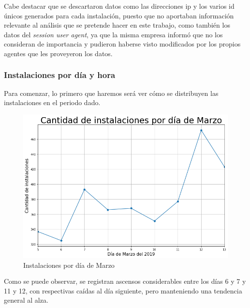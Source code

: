 \documentclass[a4paper, 12pt]{article}
\begin{document}
		Cabe destacar que se descartaron datos como las direcciones ip y los varios id únicos generados para cada instalación,
		puesto que no aportaban información relevante al análisis que se pretende hacer en este trabajo, como también los datos
		del \textit{session user agent}, ya que la misma empresa informó que no los consideran de importancia y pudieron haberse
		visto modificados por los propios agentes que les proveyeron los datos.

	\subsubsection{Instalaciones por día y hora}
		Para comenzar, lo primero que haremos será ver cómo se distribuyen las instalaciones en el periodo dado.
		\FloatBarrier
		\begin{figure}[h]
			\centering
			\includegraphics[width=\textwidth]{images/installs/installspordia.png}
			\caption{Instalaciones por día de Marzo}
		\end{figure}
		\FloatBarrier

		Como se puede observar, se registran ascensos considerables entre los días 6 y 7 y 11 y 12, con respectivas caídas al día siguiente, pero manteniendo una tendencia general al alza.
\end{document}
